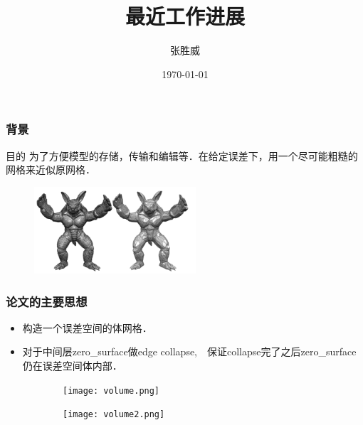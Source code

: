 \documentclass{beamer}
\title[Isotopic Approximation]{最近工作进展} %
\author{ 张胜威} %
\institute[ZJU] %
{
ZJU\\ %
\medskip
}
\date{\today} %
\begin{document}
\begin{frame}
\titlepage %
\end{frame}

\begin{frame}
\frametitle{背景} %
\tableofcontents %
\begin{block}{目的}
为了方便模型的存储，传输和编辑等．在给定误差下，用一个尽可能粗糙的网格来近似原网格．
\end{block}
\begin{example}[目标]
  \begin{figure}[h]
    \includegraphics[width=6cm]{res}
  \end{figure}
\end{example}
\end{frame}


\begin{frame}
  \frametitle{论文的主要思想}
  \begin{itemize}
    \item 构造一个误差空间的体网格．
    \item 对于中间层zero\_surface做edge collapse,　保证collapse完了之后zero\_surface仍在误差空间体内部．
  \end{itemize}

  \begin{figure}[h]
    \begin{subfigure}[b]{0.4\textwidth}
      \texttt{[image: volume.png]}
      \caption[a]{}
    \end{subfigure}
    \begin{subfigure}[b]{0.4\textwidth}
      \texttt{[image: volume2.png]}
      \caption[b]{}
    \end{subfigure}
  \end{figure}
\end{frame}
\end{document}

